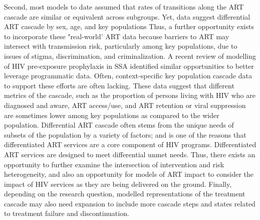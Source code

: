 \par
Second, most models to date assumed that rates of transitions along the ART cascade are
similar or equivalent across subgroups. Yet, data suggest differential ART cascade by sex, age, and key populations
\cite{Mountain2014,Lancaster2016,Green2020}
Thus, a further opportunity exists to incorporate these "real-world' ART data because barriers to ART may intersect with transmission risk,
particularly among key populations, due to issues of stigma, discrimination, and criminalization.  %
\cite{Ortblad2019,Baral2019}
A recent review of modelling of HIV pre-exposure prophylaxis in SSA\cite{Case2019} %
identified similar opportunities to better leverage programmatic data.
Often, context-specific key population cascade data to support these efforts are often lacking.\cite{Mountain2014}  %
These data suggest that different metrics of the cascade, such as the proportion of persons living with HIV who are diagnosed and aware, 
ART access/use, and ART retention or viral suppression are sometimes lower among key populations as compared to the wider population. %
Differential ART cascade often stems from the unique needs of subsets of the population by a variety of factors; and
is one of the reasons that differentiated ART services are a core component of HIV programs. %
Differentiated ART services are designed to meet differential unmet needs.
Thus, there exists an opportunity to further examine the intersection of intervention and risk heterogeneity, and also 
an opportunity for models of ART impact to consider the impact of HIV services as they are being delivered on the ground.
Finally, depending on the research question, modelled representations of the treatment cascade may also need expansion
to include more cascade steps and states related to treatment failure and discontinuation.

